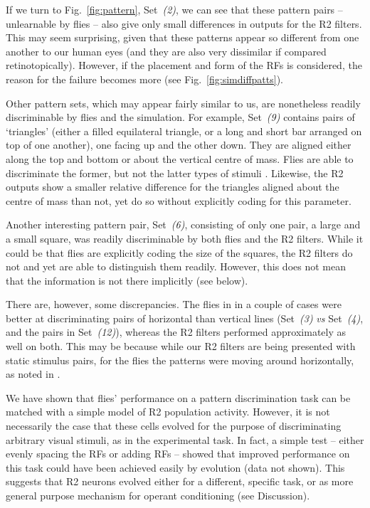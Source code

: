 If we turn to Fig.~\ref{fig:pattern}, Set~\emph{(2)}, we can see that these pattern pairs -- unlearnable by flies -- also give only small differences in outputs for the R2 filters.
This may seem surprising, given that these patterns appear so different from one another to our human eyes (and they are also very dissimilar if compared retinotopically).
However, if the placement and form of the RFs is considered, the reason for the failure becomes more  (see Fig.~\ref{fig:simdiffpatts}).

Other pattern sets, which may appear fairly similar to us, are nonetheless readily discriminable by flies and the simulation.
For example, Set~\emph{(9)} contains pairs of `triangles' (either a filled equilateral triangle, or a long and short bar arranged on top of one another), one facing up and the other down.
They are aligned either along the top and bottom or about the vertical centre of mass.
Flies are able to discriminate the former, but not the latter types of stimuli \cite{Ernst1999}.
Likewise, the R2 outputs show a smaller relative difference for the triangles aligned about the centre of mass than not, yet do so without explicitly coding for this parameter.

Another interesting pattern pair, Set~\emph{(6)}, consisting of only one pair, a large and a small square, was readily discriminable by both flies and the R2 filters.
While it could be that flies are explicitly coding the size of the squares, the R2 filters do not and yet are able to distinguish them readily.
However, this does not mean that the information is not there implicitly (see below).

There are, however, some discrepancies.
The flies in \cite{Ernst1999} in a couple of cases were better at discriminating pairs of horizontal than vertical lines (Set~\emph{(3)} \emph{vs} Set~\emph{(4)}, and the pairs in Set~\emph{(12)}), whereas the R2 filters performed approximately as well on both.
This may be because while our R2 filters are being presented with static stimulus pairs, for the flies the patterns were moving around horizontally, as noted in \cite{Ernst1999}.

We have shown that flies' performance on a pattern discrimination task can be matched with a simple model of R2 population activity.
However, it is not necessarily the case that these cells evolved for the purpose of discriminating arbitrary visual stimuli, as in the experimental task.
In fact, a simple test -- either evenly spacing the RFs or adding RFs -- showed that improved performance on this task could have been achieved easily by evolution (data not shown).
This suggests that R2 neurons evolved either for a different, specific task, or as more general purpose mechanism for operant conditioning (see Discussion).

